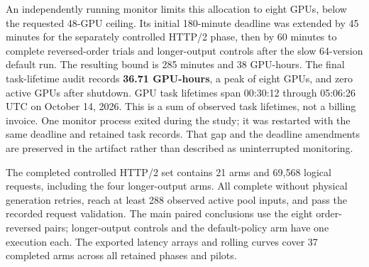 An independently running monitor limits this allocation to eight GPUs, below
the requested 48-GPU ceiling. Its initial 180-minute deadline was extended by
45 minutes for the separately controlled HTTP/2 phase, then by 60 minutes to
complete reversed-order trials and longer-output controls after the slow
64-version default run. The resulting bound is 285 minutes and 38 GPU-hours.
The final task-lifetime audit records \textbf{36.71 GPU-hours}, a peak of eight
GPUs, and zero active GPUs after shutdown. GPU task lifetimes span 00:30:12
through 05:06:26 UTC on October 14, 2026. This is a sum of observed task
lifetimes, not a billing invoice. One monitor process exited during the study;
it was restarted with the same deadline and retained task records. That gap and
the deadline amendments are preserved in the artifact rather than described as
uninterrupted monitoring.

The completed controlled HTTP/2 set contains 21 arms and 69,568 logical
requests, including the four longer-output arms. All complete without physical
generation retries, reach at least 288 observed active pool inputs, and pass
the recorded request validation. The main paired conclusions use the eight
order-reversed pairs; longer-output controls and the default-policy arm have
one execution each. The exported latency arrays and rolling curves cover
37 completed arms across all retained phases and pilots.

